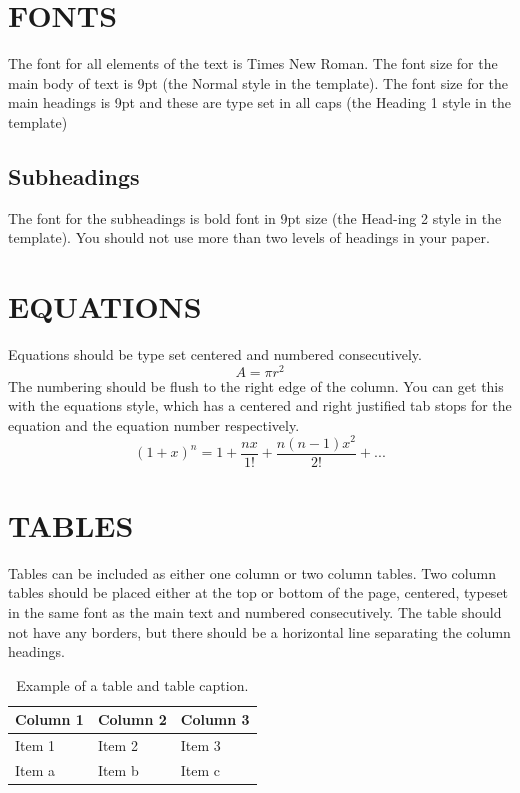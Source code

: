 \documentclass{cfm_paper} %
\begin{document}
\section*{FONTS}
The font for all elements of the text is Times New Roman. The font size for the main body of text is 9pt (the Normal style in the template). The font size for the main headings is 9pt and these are type set in all caps (the Heading 1 style in the template)

\subsection*{Subheadings}
The font for the subheadings is bold font in 9pt size (the Head-ing 2 style in the template). You should not use more than two levels of headings in your paper.

\section*{EQUATIONS}
Equations should be type set centered and numbered consecutively.
\begin{equation} %
    A = \pi r^2
\end{equation}
The numbering should be flush to the right edge of the column. You can get this with the equations style, which has a centered and right justified tab stops for the equation and the equation number respectively.
\begin{equation}
    (1+x)^n = 1 + \frac{nx}{1!}+\frac{n(n-1)x^2}{2!}+...
\end{equation}

\section*{TABLES}
Tables can be included as either one column or two column tables. Two column tables should be placed either at the top or bottom of the page, centered, typeset in the same font as the main text and numbered consecutively. The table should not have any borders, but there should be a horizontal line separating the column headings.


    \begin{table}[h]
\caption{Example of a table and table caption.} %
\label{tab:ExampleTable}
\begin{tabularx}{\columnwidth}{XXX} %
\toprule
Column 1 & Column 2 & Column 3 \\
\midrule %
Item 1   & Item 2   & Item 3   \\
Item a   & Item b   & Item c   \\
\bottomrule
\end{tabularx}
\end{table}
\end{document}
